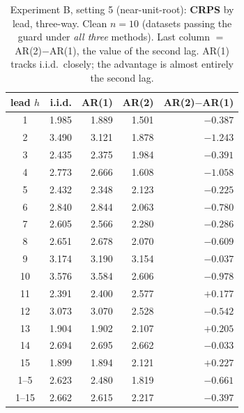 \documentclass[11pt]{article}
\begin{document}
\begin{table}[ht]
\centering
\caption{Experiment B, setting 5 (near-unit-root): \textbf{CRPS} by lead,
three-way. Clean $n = 10$ (datasets passing the guard under \emph{all three}
methods). Last column $=$ AR(2)$-$AR(1), the value of the second lag. AR(1)
tracks i.i.d.\ closely; the advantage is almost entirely the second lag.}
\label{tab:expB5crps}
\small
\begin{tabular}{crrrr}
\toprule
lead $h$ & i.i.d. & AR(1) & AR(2) & AR(2)$-$AR(1) \\
\midrule
1 & 1.985 & 1.889 & 1.501 & $-0.387$ \\
2 & 3.490 & 3.121 & 1.878 & $-1.243$ \\
3 & 2.435 & 2.375 & 1.984 & $-0.391$ \\
4 & 2.773 & 2.666 & 1.608 & $-1.058$ \\
5 & 2.432 & 2.348 & 2.123 & $-0.225$ \\
6 & 2.840 & 2.844 & 2.063 & $-0.780$ \\
7 & 2.605 & 2.566 & 2.280 & $-0.286$ \\
8 & 2.651 & 2.678 & 2.070 & $-0.609$ \\
9 & 3.174 & 3.190 & 3.154 & $-0.037$ \\
10 & 3.576 & 3.584 & 2.606 & $-0.978$ \\
11 & 2.391 & 2.400 & 2.577 & $+0.177$ \\
12 & 3.073 & 3.070 & 2.528 & $-0.542$ \\
13 & 1.904 & 1.902 & 2.107 & $+0.205$ \\
14 & 2.694 & 2.695 & 2.662 & $-0.033$ \\
15 & 1.899 & 1.894 & 2.121 & $+0.227$ \\
\midrule
1--5 & 2.623 & 2.480 & 1.819 & $-0.661$ \\
1--15 & 2.662 & 2.615 & 2.217 & $-0.397$ \\
\bottomrule
\end{tabular}
\end{table}
\end{document}
